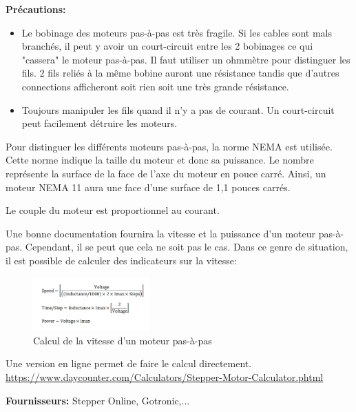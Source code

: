 \documentclass[a4paper, 11pt]{report}
\begin{document}
\textbf{Précautions:}
\begin{itemize}
\item Le bobinage des moteurs pas-à-pas est très fragile. Si les cables sont mals branchés, il peut y avoir un court-circuit entre les 2 bobinages ce qui "cassera" le moteur pas-à-pas. Il faut utiliser un ohmmètre pour distinguer les fils. 2 fils reliés à la même bobine auront une résistance tandis que d'autres connections afficheront soit rien soit une très grande résistance.
\item Toujours manipuler les fils quand il n'y a pas de courant. Un court-circuit peut facilement détruire les moteurs.
\end{itemize}

Pour distinguer les différents moteurs pas-à-pas, la norme NEMA est utilisée. Cette norme indique la taille du moteur et donc sa puissance. Le nombre représente la surface de la face de l'axe du moteur en pouce carré. Ainsi, un moteur NEMA 11 aura une face d'une surface de 1,1 pouces carrés.

Le couple du moteur est proportionnel au courant.

Une bonne documentation fournira la vitesse et la puissance d'un moteur pas-à-pas. Cependant, il se peut que cela ne soit pas le cas. Dans ce genre de situation, il est possible de calculer des indicateurs sur la vitesse:

\begin{figure}[h!]
\begin{centering}
\includegraphics[width=0.4\textwidth]{images/SpeedCalculator.jpeg}
\caption{Calcul de la vitesse d'un moteur pas-à-pas}
\par\end{centering}
\end{figure}

Une version en ligne permet de faire le calcul directement.
\url{https://www.daycounter.com/Calculators/Stepper-Motor-Calculator.phtml}

\textbf{Fournisseurs:} Stepper Online, Gotronic,...
\end{document}
